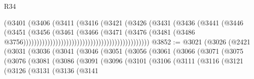 \begin{lexlean}{R34}
\begin{coremodule}
                                                              (@3401
                                                                (@3406
                                                                  (@3411
                                                                    (@3416
                                                                      (@3421
                                                                        (@3426
                                                                          (@3431
                                                                            (@3436
                                                                              (@3441
                                                                                (@3446
                                                                                  (@3451
                                                                                    (@3456
                                                                                      (@3461
                                                                                        (@3466
                                                                                          (@3471
                                                                                            (@3476
                                                                                              (@3481
                                                                                                (@3486
                                                                                                  @3756)))))))))))))))))))))))))))))))))))))))))))))))
@3852 := @3021
    (@3026
      (@2421
        (@3031
          (@3036
            (@3041
              (@3046
                (@3051
                  (@3056
                    (@3061
                      (@3066
                        (@3071
                          (@3075
                            (@3076
                              (@3081
                                (@3086
                                  (@3091
                                    (@3096
                                      (@3101
                                        (@3106
                                          (@3111
                                            (@3116
                                              (@3121
                                                (@3126
                                                  (@3131
                                                    (@3136
                                                      (@3141

\end{coremodule}
\end{lexlean}
